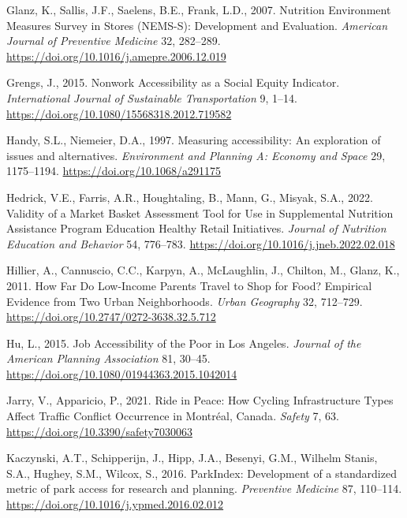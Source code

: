 \documentclass[
  letterpaper,
  DIV=11,
  numbers=noendperiod]{scrreport}
\newlength{\cslhangindent}
\newlength{\cslentryspacingunit} %
\newenvironment{CSLReferences}[2] %
 {%
  \setlength{\parindent}{0pt}
  \ifodd #1
  \let\oldpar\par
  \def\par{\hangindent=\cslhangindent\oldpar}
  \fi
  \setlength{\parskip}{#2\cslentryspacingunit}
 }%
 {}
\begin{document}
\begin{CSLReferences}{1}{0}
\leavevmode{}%
Glanz, K., Sallis, J.F., Saelens, B.E., Frank, L.D., 2007. Nutrition
{Environment Measures Survey} in {Stores} ({NEMS-S}): {Development} and
{Evaluation}. \emph{American Journal of Preventive Medicine} 32,
282--289. \url{https://doi.org/10.1016/j.amepre.2006.12.019}

\leavevmode{}%
Grengs, J., 2015. Nonwork {Accessibility} as a {Social Equity
Indicator}. \emph{International Journal of Sustainable Transportation}
9, 1--14. \url{https://doi.org/10.1080/15568318.2012.719582}

\leavevmode{}%
Handy, S.L., Niemeier, D.A., 1997. Measuring accessibility: {An}
exploration of issues and alternatives. \emph{Environment and Planning
A: Economy and Space} 29, 1175--1194.
\url{https://doi.org/10.1068/a291175}

\leavevmode{}%
Hedrick, V.E., Farris, A.R., Houghtaling, B., Mann, G., Misyak, S.A.,
2022. Validity of a {Market Basket Assessment Tool} for {Use} in
{Supplemental Nutrition Assistance Program Education Healthy Retail
Initiatives}. \emph{Journal of Nutrition Education and Behavior} 54,
776--783. \url{https://doi.org/10.1016/j.jneb.2022.02.018}

\leavevmode{}%
Hillier, A., Cannuscio, C.C., Karpyn, A., McLaughlin, J., Chilton, M.,
Glanz, K., 2011. How {Far Do Low-Income Parents Travel} to {Shop} for
{Food}? {Empirical Evidence} from {Two Urban Neighborhoods}. \emph{Urban
Geography} 32, 712--729.
\url{https://doi.org/10.2747/0272-3638.32.5.712}

\leavevmode{}%
Hu, L., 2015. Job {Accessibility} of the {Poor} in {Los Angeles}.
\emph{Journal of the American Planning Association} 81, 30--45.
\url{https://doi.org/10.1080/01944363.2015.1042014}

\leavevmode{}%
Jarry, V., Apparicio, P., 2021. Ride in {Peace}: {How Cycling
Infrastructure Types Affect Traffic Conflict Occurrence} in {Montréal},
{Canada}. \emph{Safety} 7, 63.
\url{https://doi.org/10.3390/safety7030063}

\leavevmode{}%
Kaczynski, A.T., Schipperijn, J., Hipp, J.A., Besenyi, G.M., Wilhelm
Stanis, S.A., Hughey, S.M., Wilcox, S., 2016. {ParkIndex}: {Development}
of a standardized metric of park access for research and planning.
\emph{Preventive Medicine} 87, 110--114.
\url{https://doi.org/10.1016/j.ypmed.2016.02.012}


\end{CSLReferences}
\end{document}
